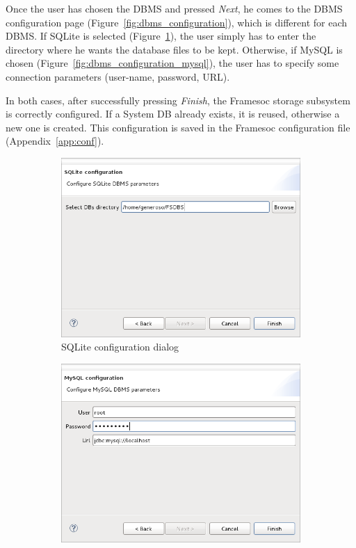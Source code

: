 \documentclass[twoside]{article}
\begin{document}
\begin{sloppypar}
Once the user has chosen the DBMS and pressed \emph{Next}, he comes to the DBMS configuration page (Figure~\ref{fig:dbms_configuration}), which is different for each DBMS.
If SQLite is selected (Figure~\ref{fig:dbms_configuration_sqlite}), the user simply has to enter the directory where he wants the database files to be kept.
Otherwise, if MySQL is chosen (Figure~\ref{fig:dbms_configuration_mysql}), the user has to specify some connection parameters (user-name, password, URL).

In both cases, after successfully pressing \emph{Finish}, the Framesoc storage subsystem is correctly configured. 
If a System DB already exists, it is reused, otherwise a new one is created.
This configuration is saved in the Framesoc configuration file (Appendix~\ref{app:conf}). 

\begin{figure}[h!]
 \centering
 \begin{subfigure}[c]{0.46\textwidth}
    \includegraphics[width=1.0\textwidth]{images/dbms_configuration_sqlite.png}
    \caption{SQLite configuration dialog}
    \label{fig:dbms_configuration_sqlite}
 \end{subfigure}%
 \hspace{30pt}
 \begin{subfigure}[c]{0.46\textwidth}
    \includegraphics[width=1.0\textwidth]{images/dbms_configuration_mysql.png}

\end{subfigure}
\end{figure}
\end{sloppypar}
\end{document}
